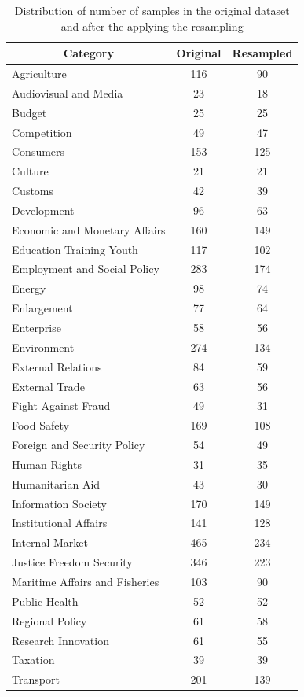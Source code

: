 \begin{table}[!ht]
\centering
\begin{tabular}{lcc}
\hline
\multicolumn{1}{c}{Category} & Original & Resampled \\ \hline
Agriculture & 116 & 90 \\
Audiovisual and Media & 23 & 18 \\
Budget & 25 & 25 \\
Competition & 49 & 47 \\
Consumers & 153 & 125 \\
Culture & 21 & 21 \\
Customs & 42 & 39 \\
Development & 96 & 63 \\
Economic and Monetary Affairs & 160 & 149 \\
Education Training Youth & 117 & 102 \\
Employment and Social Policy & 283 & 174 \\
Energy & 98 & 74 \\
Enlargement & 77 & 64 \\
Enterprise & 58 & 56 \\
Environment & 274 & 134 \\
External Relations & 84 & 59 \\
External Trade & 63 & 56 \\
Fight Against Fraud & 49 & 31 \\
Food Safety & 169 & 108 \\
Foreign and Security Policy & 54 & 49 \\
Human Rights & 31 & 35 \\
Humanitarian Aid & 43 & 30 \\
Information Society & 170 & 149 \\
Institutional Affairs & 141 & 128 \\
Internal Market & 465 & 234 \\
Justice Freedom Security & 346 & 223 \\
Maritime Affairs and Fisheries & 103 & 90 \\
Public Health & 52 & 52 \\
Regional Policy & 61 & 58 \\
Research Innovation & 61 & 55 \\
Taxation & 39 & 39 \\
Transport & 201 & 139 \\ \cline{1-3}
\end{tabular}
\caption{Distribution of number of samples in the original dataset and after the applying the resampling}
\label{table:befforeAfterResampling}
\end{table}


